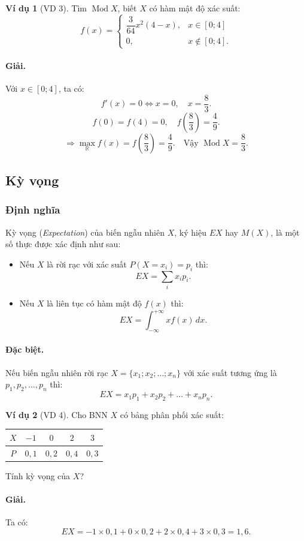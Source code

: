 \documentclass[12pt,a4paper]{article}
\theoremstyle{definition}
\newtheorem{vidu}{Ví dụ}[section]
\begin{document}
\begin{vidu}[VD 3]
Tìm $\operatorname{Mod} X$, biết $X$ có hàm mật độ xác suất:
\[
f(x) = \begin{cases}
\dfrac{3}{64} x^2 (4 - x), & x \in [0; 4] \\
0, & x \notin [0; 4].
\end{cases}
\]

\paragraph{Giải.} Với $x \in [0; 4]$, ta có:
\[
f'(x) = 0 \Leftrightarrow x = 0, \quad x = \frac{8}{3}.
\]
\[
f(0) = f(4) = 0, \quad f\left(\frac{8}{3}\right) = \frac{4}{9}.
\]
\[
\Rightarrow \max_{\mathbb{R}} f(x) = f\left(\frac{8}{3}\right) = \frac{4}{9}. \quad \text{Vậy } \operatorname{Mod} X = \frac{8}{3}.
\]
\end{vidu}

\subsection{Kỳ vọng}

\subsubsection{Định nghĩa}
Kỳ vọng (\textit{Expectation}) của biến ngẫu nhiên $X$, ký hiệu $EX$ hay $M(X)$, là một số thực được xác định như sau:
\begin{itemize}
    \item Nếu $X$ là rời rạc với xác suất $P(X = x_i) = p_i$ thì:
    \[
    EX = \sum_i x_i p_i.
    \]
    \item Nếu $X$ là liên tục có hàm mật độ $f(x)$ thì:
    \[
    EX = \int_{-\infty}^{+\infty} x f(x)\,dx.
    \]
\end{itemize}

\paragraph{Đặc biệt.} Nếu biến ngẫu nhiên rời rạc $X = \{x_1; x_2; \dots; x_n\}$ với xác suất tương ứng là $p_1, p_2, \dots, p_n$ thì:
\[
EX = x_1 p_1 + x_2 p_2 + \dots + x_n p_n.
\]

\begin{vidu}[VD 4]
Cho BNN $X$ có bảng phân phối xác suất:
\begin{center}
\begin{tabular}{|c|c|c|c|c|}
\hline
$X$ & $-1$ & $0$ & $2$ & $3$ \\
\hline
$P$ & $0{,}1$ & $0{,}2$ & $0{,}4$ & $0{,}3$ \\
\hline
\end{tabular}
\end{center}
Tính kỳ vọng của $X$?

\paragraph{Giải.} Ta có:
\[
EX = -1 \times 0{,}1 + 0 \times 0{,}2 + 2 \times 0{,}4 + 3 \times 0{,}3 = 1{,}6.
\]
\end{vidu}
\end{document}
